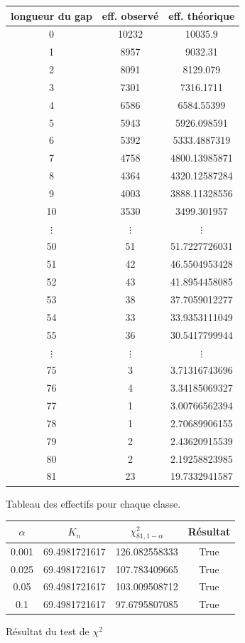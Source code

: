\documentclass[10pt,a4paper]{article}
\begin{document}
\begin{figure}[H]
\begin{center}
\begin{longtable}{|c|c|c|}
\hline
longueur du gap & eff. observé & eff. théorique\\
\hline
0 & 10232 & 10035.9\\
1 & 8957 & 9032.31\\
2 & 8091 & 8129.079\\
3 & 7301 & 7316.1711\\
4 & 6586 & 6584.55399\\
5 & 5943 & 5926.098591\\
6 & 5392 & 5333.4887319\\
7 & 4758 & 4800.13985871\\
8 & 4364 & 4320.12587284\\
9 & 4003 & 3888.11328556\\
10 & 3530 & 3499.301957\\
$\vdots$ & $\vdots$ & $\vdots$ \\ 
50 & 51 & 51.7227726031\\
51 & 42 & 46.5504953428\\
52 & 43 & 41.8954458085\\
53 & 38 & 37.7059012277\\
54 & 33 & 33.9353111049\\
55 & 36 & 30.5417799944\\
$\vdots$ & $\vdots$ & $\vdots$ \\ 
75 & 3 & 3.71316743696\\
76 & 4 & 3.34185069327\\
77 & 1 & 3.00766562394\\
78 & 1 & 2.70689906155\\
79 & 2 & 2.43620915539\\
80 & 2 & 2.19258823985\\
81 & 23 & 19.7332941587\\
\hline
\end{longtable}
\end{center}
\caption{Tableau des effectifs pour chaque classe.}
\end{figure}
\begin{figure}[H]
\begin{center}
\begin{tabular}{|c|c|c|c|}
\hline
$\alpha$ & $K_{n}$ & $\chi^2_{81, 1 - \alpha}$ & Résultat\\
\hline
0.001 & 69.4981721617 & 126.082558333 & True\\
0.025 & 69.4981721617 & 107.783409665 & True\\
0.05 & 69.4981721617 & 103.009508712 & True\\
0.1 & 69.4981721617 & 97.6795807085 & True\\
\hline
\end{tabular}
\end{center}
\caption{Résultat du test de $\chi^2$}
\label{result2}
\end{figure}
\end{document}
